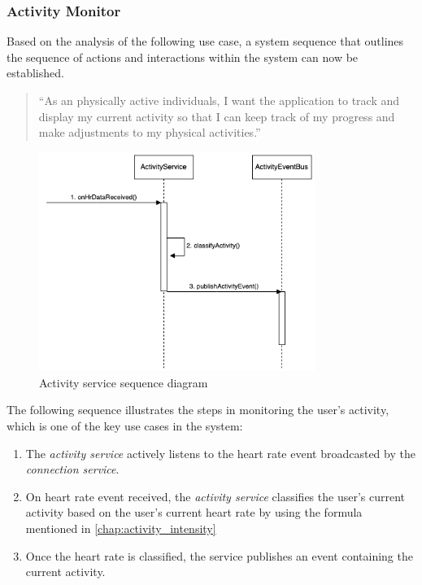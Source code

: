 \subsubsection{Activity Monitor}
Based on the analysis of the following use case, a system sequence that outlines the sequence of actions and interactions within the system can now be established.
\begin{quotation}
    \enquote{As an physically active individuals, I want the application to track and display my current activity so that I can keep track of my progress and make adjustments to my physical activities.} 
\end{quotation}

\begin{figure}[H]
    \centering
    \includegraphics[width=0.8\textwidth]{diagrams/activity-monitor-seq.drawio.png}
    \caption{Activity service sequence diagram}
    \label{fig:activity_diagram}
\end{figure}

The following sequence illustrates the steps in monitoring the user's activity, which is one of the key use cases in the system:
\begin{enumerate}
    \item The \emph{activity service} actively listens to the heart rate event broadcasted by the \emph{connection service}.
    \item On heart rate event received, the \emph{activity service} classifies the user's current activity based on the user's current heart rate by using the formula mentioned in \autoref{chap:activity_intensity}
    \item Once the heart rate is classified, the service publishes an event containing the current activity.
\end{enumerate}

